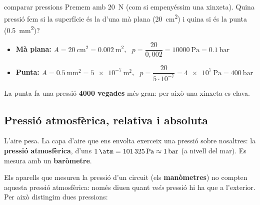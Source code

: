 \begin{exemple}{comparar pressions}
Premem amb \SI{20}{\newton} (com si empenyéssim una xinxeta). Quina pressió fem si la superfície és la d'una mà plana (\SI{20}{\centi\meter\squared}) i quina si és la punta (\SI{0,5}{\milli\meter\squared})?
\begin{itemize}
 \item \textbf{Mà plana:} $A = \SI{20}{\centi\meter\squared} = \SI{0,002}{\meter\squared}$, \ $p = \dfrac{20}{0{,}002} = \SI{10000}{\pascal} = \SI{0,1}{\bar}$
 \item \textbf{Punta:} $A = \SI{0,5}{\milli\meter\squared} = \SI{5e-7}{\meter\squared}$, \ $p = \dfrac{20}{5\cdot10^{-7}} = \SI{4e7}{\pascal} = \SI{400}{\bar}$
\end{itemize}
La punta fa una pressió \textbf{4000 vegades} més gran: per això una xinxeta es clava.
\end{exemple}

\subsection*{Pressió atmosfèrica, relativa i absoluta}

L'aire pesa. La capa d'aire que ens envolta exerceix una pressió sobre nosaltres: la \textbf{pressió atmosfèrica}, d'uns $\SI{1}{\atm} = \SI{101325}{\pascal} \approx \SI{1}{\bar}$ (a nivell del mar). Es mesura amb un \textbf{baròmetre}.

Els aparells que mesuren la pressió d'un circuit (els \textbf{manòmetres}) no compten aquesta pressió atmosfèrica: només diuen quant \emph{més} pressió hi ha que a l'exterior. Per això distingim dues pressions:

\begin{center}
\end{center}

